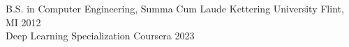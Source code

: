 \begin{samepage}
  \iflongform
    \nopagebreak
  \else
  \fi


  \begin{cventries}

    \cventry
    {B.S. in Computer Engineering, Summa Cum Laude} %
    {Kettering University} %
    {Flint, MI} %
    {2012} %
    {
    }
    \iflongform
    \else
      \\\cventry
      {Deep Learning Specialization} %
      {Coursera} %
      {} %
      {2023} %
      {}
    \fi

  \end{cventries}
\end{samepage}